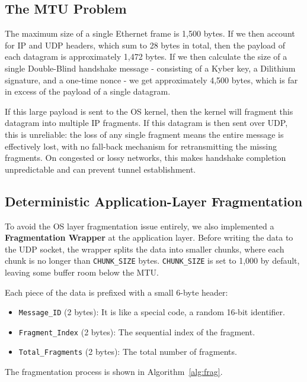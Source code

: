 \documentclass[10pt, conference, letterpaper]{IEEEtran}
\begin{document}
\subsection{The MTU Problem}
The maximum size of a single Ethernet frame is 1,500 bytes. If we then account for IP and UDP headers, which sum to 28 bytes in total, then the payload of each datagram is approximately 1,472 bytes. If we then calculate the size of a single Double-Blind handshake message - consisting of a Kyber key, a Dilithium signature, and a one-time nonce - we get approximately 4,500 bytes, which is far in excess of the payload of a single datagram.

If this large payload is sent to the OS kernel, then the kernel will fragment this datagram into multiple IP fragments. If this datagram is then sent over UDP, this is unreliable: the loss of any single fragment means the entire message is effectively lost, with no fall-back mechanism for retransmitting the missing fragments. On congested or lossy networks, this makes handshake completion unpredictable and can prevent tunnel establishment.

\subsection{Deterministic Application-Layer Fragmentation}
To avoid the OS layer fragmentation issue entirely, we also implemented a \textbf{Fragmentation Wrapper} at the application layer. Before writing the data to the UDP socket, the wrapper splits the data into smaller chunks, where each chunk is no longer than \texttt{CHUNK\_SIZE} bytes. \texttt{CHUNK\_SIZE} is set to 1,000 by default, leaving some buffer room below the MTU.

Each piece of the data is prefixed with a small 6-byte header:
\begin{itemize}
    \item \texttt{Message\_ID} (2 bytes): It is like a special code, a random 16-bit identifier.
    \item \texttt{Fragment\_Index} (2 bytes): The sequential index of the fragment.
    \item \texttt{Total\_Fragments} (2 bytes): The total number of fragments.
\end{itemize}

The fragmentation process is shown in Algorithm~\ref{alg:frag}.
\end{document}
